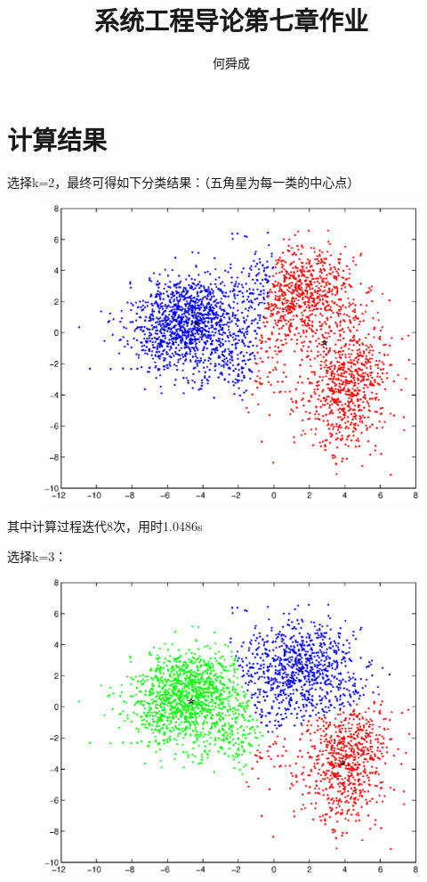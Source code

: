 \documentclass[UTF8]{ctexart}
\author{何舜成}
\title{系统工程导论第七章作业}
\begin{document}
\maketitle
\section{计算结果}
选择k=2，最终可得如下分类结果：（五角星为每一类的中心点）\par
\begin{figure}[tbp]
  \centering
  \includegraphics[width=1.05\textwidth]{kmeans2.eps}
\end{figure}
\par
其中计算过程迭代8次，用时1.0486s\par
选择k=3：\par
\begin{figure}[tbp]
  \centering
  \includegraphics[width=1.05\textwidth]{kmeans3.eps}
\end{figure}
\end{document}
